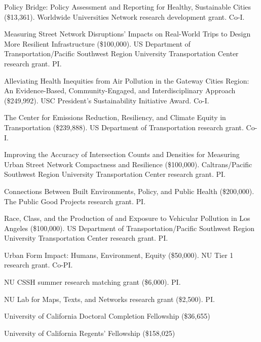 \documentclass[11pt,a4paper]{report} %
\begin{document}
\begin{tablist}

\item[2025--27] \tab{}Policy Bridge: Policy Assessment and Reporting for Healthy, Sustainable Cities (\$13,361). Worldwide Universities Network research development grant. Co-I\@.

\item[2024--25] \tab{}Measuring Street Network Disruptions' Impacts on Real-World Trips to Design More Resilient Infrastructure (\$100,000). US Department of Transportation/Pacific Southwest Region University Transportation Center research grant. PI\@.

\item[2024--25] \tab{}Alleviating Health Inequities from Air Pollution in the Gateway Cities Region: An Evidence-Based, Community-Engaged, and Interdisciplinary Approach (\$249,992). USC President's Sustainability Initiative Award. Co-I\@.

\item[2024--25] \tab{}The Center for Emissions Reduction, Resiliency, and Climate Equity in Transportation (\$239,888). US Department of Transportation research grant. Co-I\@.

\item[2021--22] \tab{}Improving the Accuracy of Intersection Counts and Densities for Measuring Urban Street Network Compactness and Resilience (\$100,000). Caltrans/Pacific Southwest Region University Transportation Center research grant. PI\@.

\item[2020--22] \tab{}Connections Between Built Environments, Policy, and Public Health (\$200,000). The Public Good Projects research grant. PI\@.

\item[2020--21] \tab{}Race, Class, and the Production of and Exposure to Vehicular Pollution in Los Angeles (\$100,000). US Department of Transportation/Pacific Southwest Region University Transportation Center research grant. PI\@.

\item[2019] \tab{}Urban Form Impact: Humans, Environment, Equity (\$50,000). NU Tier 1 research grant. Co-PI\@.

\item[2019] \tab{}NU CSSH summer research matching grant (\$6,000). PI\@.

\item[2019] \tab{}NU Lab for Maps, Texts, and Networks research grant (\$2,500). PI\@.

\item[2016--17] \tab{}University of California Doctoral Completion Fellowship (\$36,655)

\item[2012--16] \tab{}University of California Regents' Fellowship (\$158,025)

\end{tablist}
\end{document}

